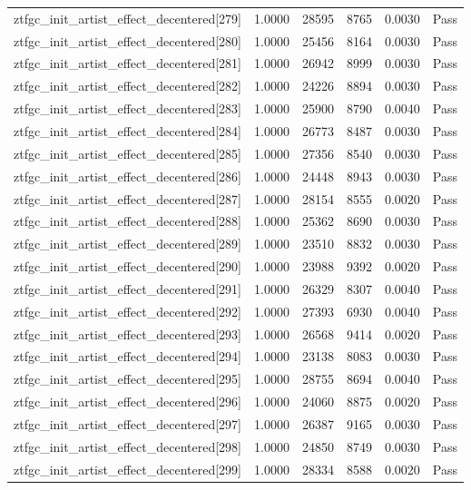 \begin{table}[htbp]
\begin{tabular}{llrrll}
ztfgc\_init\_artist\_effect\_decentered[279] & 1.0000 & 28595 & 8765 & 0.0030 & Pass \\
ztfgc\_init\_artist\_effect\_decentered[280] & 1.0000 & 25456 & 8164 & 0.0030 & Pass \\
ztfgc\_init\_artist\_effect\_decentered[281] & 1.0000 & 26942 & 8999 & 0.0030 & Pass \\
ztfgc\_init\_artist\_effect\_decentered[282] & 1.0000 & 24226 & 8894 & 0.0030 & Pass \\
ztfgc\_init\_artist\_effect\_decentered[283] & 1.0000 & 25900 & 8790 & 0.0040 & Pass \\
ztfgc\_init\_artist\_effect\_decentered[284] & 1.0000 & 26773 & 8487 & 0.0030 & Pass \\
ztfgc\_init\_artist\_effect\_decentered[285] & 1.0000 & 27356 & 8540 & 0.0030 & Pass \\
ztfgc\_init\_artist\_effect\_decentered[286] & 1.0000 & 24448 & 8943 & 0.0030 & Pass \\
ztfgc\_init\_artist\_effect\_decentered[287] & 1.0000 & 28154 & 8555 & 0.0020 & Pass \\
ztfgc\_init\_artist\_effect\_decentered[288] & 1.0000 & 25362 & 8690 & 0.0030 & Pass \\
ztfgc\_init\_artist\_effect\_decentered[289] & 1.0000 & 23510 & 8832 & 0.0030 & Pass \\
ztfgc\_init\_artist\_effect\_decentered[290] & 1.0000 & 23988 & 9392 & 0.0020 & Pass \\
ztfgc\_init\_artist\_effect\_decentered[291] & 1.0000 & 26329 & 8307 & 0.0040 & Pass \\
ztfgc\_init\_artist\_effect\_decentered[292] & 1.0000 & 27393 & 6930 & 0.0040 & Pass \\
ztfgc\_init\_artist\_effect\_decentered[293] & 1.0000 & 26568 & 9414 & 0.0020 & Pass \\
ztfgc\_init\_artist\_effect\_decentered[294] & 1.0000 & 23138 & 8083 & 0.0030 & Pass \\
ztfgc\_init\_artist\_effect\_decentered[295] & 1.0000 & 28755 & 8694 & 0.0040 & Pass \\
ztfgc\_init\_artist\_effect\_decentered[296] & 1.0000 & 24060 & 8875 & 0.0020 & Pass \\
ztfgc\_init\_artist\_effect\_decentered[297] & 1.0000 & 26387 & 9165 & 0.0030 & Pass \\
ztfgc\_init\_artist\_effect\_decentered[298] & 1.0000 & 24850 & 8749 & 0.0030 & Pass \\
ztfgc\_init\_artist\_effect\_decentered[299] & 1.0000 & 28334 & 8588 & 0.0020 & Pass \\

\end{tabular}
\end{table}

